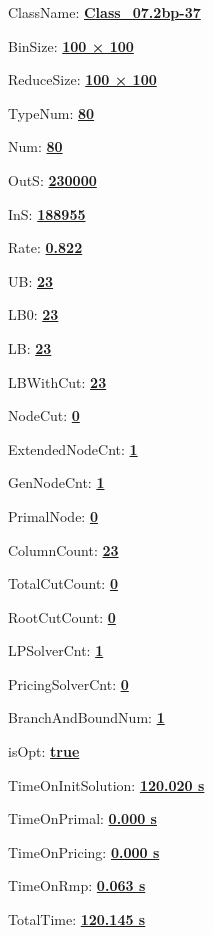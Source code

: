 \documentclass[11pt]{article}
\begin{document}
\pagestyle{empty}


ClassName: \underline{\textbf{Class_07.2bp-37}}
\par
BinSize: \underline{\textbf{100 × 100}}
\par
ReduceSize: \underline{\textbf{100 × 100}}
\par
TypeNum: \underline{\textbf{80}}
\par
Num: \underline{\textbf{80}}
\par
OutS: \underline{\textbf{230000}}
\par
InS: \underline{\textbf{188955}}
\par
Rate: \underline{\textbf{0.822}}
\par
UB: \underline{\textbf{23}}
\par
LB0: \underline{\textbf{23}}
\par
LB: \underline{\textbf{23}}
\par
LBWithCut: \underline{\textbf{23}}
\par
NodeCut: \underline{\textbf{0}}
\par
ExtendedNodeCnt: \underline{\textbf{1}}
\par
GenNodeCnt: \underline{\textbf{1}}
\par
PrimalNode: \underline{\textbf{0}}
\par
ColumnCount: \underline{\textbf{23}}
\par
TotalCutCount: \underline{\textbf{0}}
\par
RootCutCount: \underline{\textbf{0}}
\par
LPSolverCnt: \underline{\textbf{1}}
\par
PricingSolverCnt: \underline{\textbf{0}}
\par
BranchAndBoundNum: \underline{\textbf{1}}
\par
isOpt: \underline{\textbf{true}}
\par
TimeOnInitSolution: \underline{\textbf{120.020 s}}
\par
TimeOnPrimal: \underline{\textbf{0.000 s}}
\par
TimeOnPricing: \underline{\textbf{0.000 s}}
\par
TimeOnRmp: \underline{\textbf{0.063 s}}
\par
TotalTime: \underline{\textbf{120.145 s}}
\par
\newpage


\end{document}
